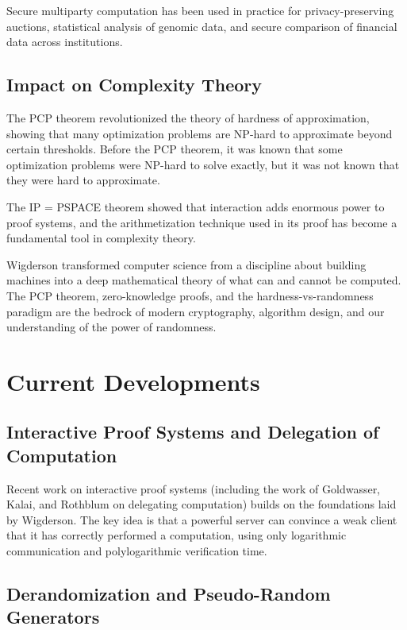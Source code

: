 Secure multiparty computation has been used in practice for privacy-preserving auctions, statistical analysis of genomic data, and secure comparison of financial data across institutions.

\subsection{Impact on Complexity Theory}

The PCP theorem revolutionized the theory of hardness of approximation, showing that many optimization problems are NP-hard to approximate beyond certain thresholds. Before the PCP theorem, it was known that some optimization problems were NP-hard to solve exactly, but it was not known that they were hard to approximate.

The IP = PSPACE theorem showed that interaction adds enormous power to proof systems, and the arithmetization technique used in its proof has become a fundamental tool in complexity theory.

\begin{whyitmatters}
Wigderson transformed computer science from a discipline about building machines into a deep mathematical theory of what can and cannot be computed. The PCP theorem, zero-knowledge proofs, and the hardness-vs-randomness paradigm are the bedrock of modern cryptography, algorithm design, and our understanding of the power of randomness.
\end{whyitmatters}

\section{Current Developments}

\subsection{Interactive Proof Systems and Delegation of Computation}

Recent work on interactive proof systems (including the work of Goldwasser, Kalai, and Rothblum on delegating computation) builds on the foundations laid by Wigderson. The key idea is that a powerful server can convince a weak client that it has correctly performed a computation, using only logarithmic communication and polylogarithmic verification time.

\subsection{Derandomization and Pseudo-Random Generators}

